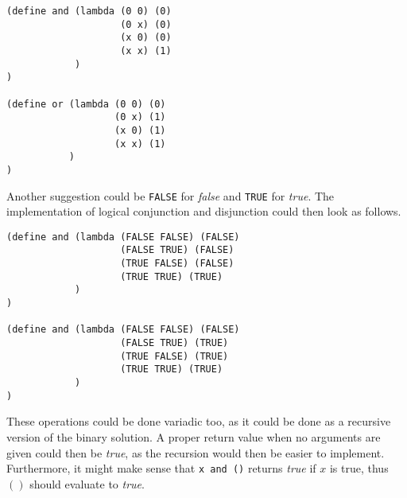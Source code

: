 \begin{verbatim}
(define and (lambda (0 0) (0)
                    (0 x) (0)
                    (x 0) (0)
                    (x x) (1)
            )
)

(define or (lambda (0 0) (0)
                   (0 x) (1)
                   (x 0) (1)
                   (x x) (1)
           )
)
\end{verbatim}

Another suggestion could be \texttt{FALSE} for \textit{false} and \texttt{TRUE} for \textit{true}. The implementation of logical conjunction and disjunction could then look as follows.

\begin{verbatim}
(define and (lambda (FALSE FALSE) (FALSE)
                    (FALSE TRUE) (FALSE)
                    (TRUE FALSE) (FALSE)
                    (TRUE TRUE) (TRUE)
            )
)

(define and (lambda (FALSE FALSE) (FALSE)
                    (FALSE TRUE) (TRUE)
                    (TRUE FALSE) (TRUE)
                    (TRUE TRUE) (TRUE)
            )
)
\end{verbatim}

These operations could be done variadic too, as it could be done as a recursive version of the binary solution. A proper return value when no arguments are given could then be \textit{true}, as the recursion would then be easier to implement. Furthermore, it might make sense that \texttt{x and ()} returns \textit{true} if $x$ is true, thus $()$ should evaluate to \textit{true}.
